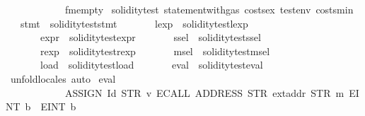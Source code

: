 \begin{isabellebody}
\ \ \ \ \ \ \ \ \ \ \ \ fmempty{\isachardoublequoteclose}\isanewline
\isanewline
{}\isamarkupfalse%
\ soliditytest{}{\isacharcolon}{\kern0pt}\ statement{\isacharunderscore}{\kern0pt}with{\isacharunderscore}{\kern0pt}gas\ costs{\isacharunderscore}{\kern0pt}ex\ testenv{}\ costs{\isacharunderscore}{\kern0pt}min\isanewline
\ \ \ stmt{}\ {\isacharequal}{\kern0pt}\ {\isachardoublequoteopen}soliditytest{}{\isachardot}{\kern0pt}stmt{\isachardoublequoteclose}\isanewline
\ \ \ \ \ \ \ lexp{}\ {\isacharequal}{\kern0pt}\ soliditytest{}{\isachardot}{\kern0pt}lexp\ \isanewline
\ \ \ \ \ \ \ expr{}\ {\isacharequal}{\kern0pt}\ soliditytest{}{\isachardot}{\kern0pt}expr\isanewline
\ \ \ \ \ \ \ ssel{}\ {\isacharequal}{\kern0pt}\ soliditytest{}{\isachardot}{\kern0pt}ssel\isanewline
\ \ \ \ \ \ \ rexp{}\ {\isacharequal}{\kern0pt}\ soliditytest{}{\isachardot}{\kern0pt}rexp\isanewline
\ \ \ \ \ \ \ msel{}\ {\isacharequal}{\kern0pt}\ soliditytest{}{\isachardot}{\kern0pt}msel\isanewline
\ \ \ \ \ \ \ load{}\ {\isacharequal}{\kern0pt}\ soliditytest{}{\isachardot}{\kern0pt}load\isanewline
\ \ \ \ \ \ \ eval{}\ {\isacharequal}{\kern0pt}\ soliditytest{}{\isachardot}{\kern0pt}eval\isanewline
%
\isadelimproof
\ \ %
\endisadelimproof
%
\isatagproof
{}\isamarkupfalse%
\ unfold{\isacharunderscore}{\kern0pt}locales\ auto%
\endisatagproof
{\isafoldproof}%
%
\isadelimproof
\isanewline
%
\endisadelimproof
\isanewline
{}\isamarkupfalse%
\ {\isachardoublequoteopen}eval{}\ {}{}{}{}\isanewline
\ \ \ \ \ \ \ \ \ \ \ \ {\isacharparenleft}{\kern0pt}ASSIGN\ {\isacharparenleft}{\kern0pt}Id\ {\isacharparenleft}{\kern0pt}STR\ {\isacharprime}{\kern0pt}{\isacharprime}{\kern0pt}v{}{\isacharprime}{\kern0pt}{\isacharprime}{\kern0pt}{\isacharparenright}{\kern0pt}{\isacharparenright}{\kern0pt}\ {\isacharparenleft}{\kern0pt}ECALL\ {\isacharparenleft}{\kern0pt}ADDRESS\ {\isacharparenleft}{\kern0pt}STR\ {\isacharprime}{\kern0pt}{\isacharprime}{\kern0pt}extaddr{\isacharprime}{\kern0pt}{\isacharprime}{\kern0pt}{\isacharparenright}{\kern0pt}{\isacharparenright}{\kern0pt}\ {\isacharparenleft}{\kern0pt}STR\ {\isacharprime}{\kern0pt}{\isacharprime}{\kern0pt}m{}{\isacharprime}{\kern0pt}{\isacharprime}{\kern0pt}{\isacharparenright}{\kern0pt}\ {\isacharbrackleft}{\kern0pt}E{\isachardot}{\kern0pt}INT\ b{}\ {}{\isacharcomma}{\kern0pt}\ E{\isachardot}{\kern0pt}INT\ b{}\ {}{\isacharbrackright}{\kern0pt}{\isacharparenright}{\kern0pt}{\isacharparenright}{\kern0pt}\isanewline

\end{isabellebody}
